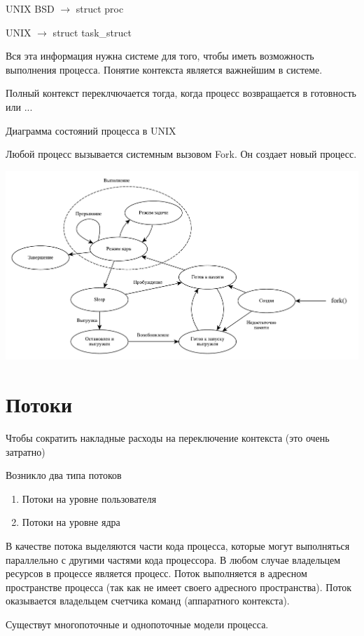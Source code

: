 \documentclass[a4paper, 14pt]{report}
\begin{document}
UNIX BSD $\to$ struct proc

UNIX $\to$ struct task\_struct

Вся эта информация нужна системе для того, чтобы иметь возможность выполнения процесса. Понятие контекста является важнейшим в системе.

Полный контекст переклчючается тогда, когда процесс возвращается в готовность или ...

Диаграмма состояний процесса в UNIX

Любой процесс вызывается системным вызовом Fork. Он создает новый процесс.

\includegraphics[scale=0.5]{os8}

\section{Потоки}

Чтобы сократить накладные расходы на переключение контекста (это очень затратно)

Возникло два типа потоков

\begin{enumerate}
    \item Потоки на уровне пользователя
    \item Потоки на уровне ядра
\end{enumerate}

В качестве потока выделяются части кода процесса, которые могут выполняться параллельно с другими частями кода процессора. В любом случае владельцем ресурсов в процессе является процесс. Поток выполняется в адресном пространстве процесса (так как не имеет своего адресного пространства). Поток оказывается владельцем счетчика команд (аппаратного контекста).

Существут многопоточные и однопоточные модели процесса.
\end{document}
